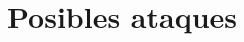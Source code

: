 \documentclass[
  a4paper,
  12pt,
  spanish,
]{scrartcl}
\begin{document}
\section{Posibles ataques}



\newpage
\printbibliography
\end{document}
